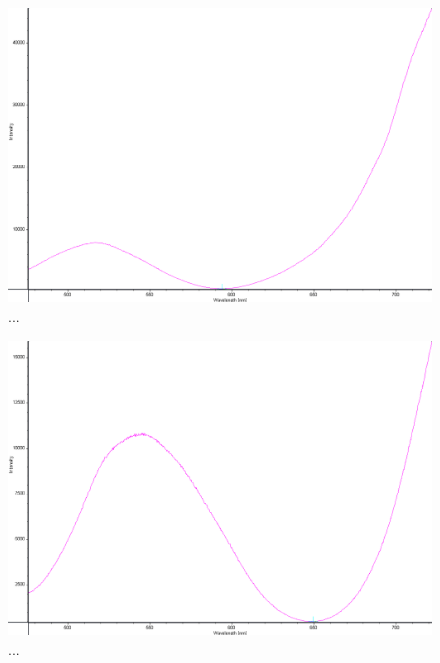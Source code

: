 \documentclass[a4paper]{article}
\begin{document}
\FloatBarrier
\begin{figure}[h!]
	\centering
	\includegraphics[width=\linewidth]{data/spektra_aktiv1_inv}
	\caption{...}
	\label{fig:}
\end{figure}
\FloatBarrier

\FloatBarrier
\begin{figure}[h!]
	\centering
	\includegraphics[width=\linewidth]{data/spektra_aktiv2_inv}
	\caption{...}
	\label{fig:}
\end{figure}
\FloatBarrier
\end{document}
